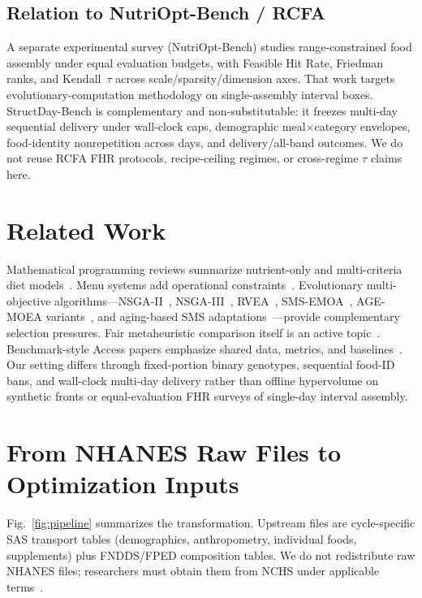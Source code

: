\documentclass{ieeeaccess}
\begin{document}
\subsection{Relation to NutriOpt-Bench / RCFA}
A separate experimental survey (NutriOpt-Bench) studies range-constrained food assembly under equal evaluation budgets, with Feasible Hit Rate, Friedman ranks, and Kendall~$\tau$ across scale/sparsity/dimension axes. That work targets evolutionary-computation methodology on single-assembly interval boxes. StructDay-Bench is complementary and non-substitutable: it freezes multi-day sequential delivery under wall-clock caps, demographic meal$\times$category envelopes, food-identity nonrepetition across days, and delivery/all-band outcomes. We do not reuse RCFA FHR protocols, recipe-ceiling regimes, or cross-regime $\tau$ claims here.

\section{Related Work}
Mathematical programming reviews summarize nutrient-only and multi-criteria diet models~\cite{dooren2018,gazan2018}. Menu systems add operational constraints~\cite{seljak2009,benvenuti2020,sahin2024}. Evolutionary multi-objective algorithms---NSGA-II~\cite{deb2002}, NSGA-III~\cite{nsga3}, RVEA~\cite{rvea}, SMS-EMOA~\cite{sms2007}, AGE-MOEA variants~\cite{age1,age2}, and aging-based SMS adaptations~\cite{aging2025}---provide complementary selection pressures. Fair metaheuristic comparison itself is an active topic~\cite{metaheuristics2021}. Benchmark-style Access papers emphasize shared data, metrics, and baselines~\cite{dales2021,cduie2023,nasbenchnlp2022}. Our setting differs through fixed-portion binary genotypes, sequential food-ID bans, and wall-clock multi-day delivery rather than offline hypervolume on synthetic fronts or equal-evaluation FHR surveys of single-day interval assembly.

\section{From NHANES Raw Files to Optimization Inputs}
\label{sec:pipeline}
Fig.~\ref{fig:pipeline} summarizes the transformation. Upstream files are cycle-specific SAS transport tables (demographics, anthropometry, individual foods, supplements) plus FNDDS/FPED composition tables. We do not redistribute raw NHANES files; researchers must obtain them from NCHS under applicable terms~\cite{cdcDietary}.
\end{document}
